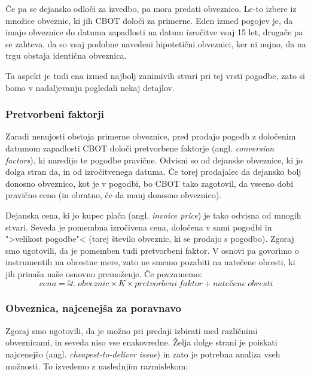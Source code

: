 \documentclass[a4paper]{article}
\begin{document}
Če pa se dejansko odloči za izvedbo, pa mora predati obveznico. Le-to izbere iz množice obveznic, ki jih
CBOT določi za primerne. Eden izmed pogojev je, da imajo obveznice do datuma zapadlosti na datum izročitve
vsaj 15 let, drugače pa se zahteva, da so vsaj podobne navedeni hipotetični obveznici, ker ni nujno, da na
trgu obstaja identična obveznica. 

Ta aspekt je tudi ena izmed najbolj zanimivih stvari pri tej vrsti pogodbe, zato si bomo v nadaljevanju 
pogledali nekaj detajlov.


\subsubsection{Pretvorbeni faktorji}
Zaradi nenujosti obstoja primerne obveznice, pred prodajo pogodb z določenim datumom zapadlosti CBOT 
določi pretvorbene faktorje (angl. \textit{conversion factors}), ki naredijo te pogodbe pravične. 
Odvisni so od dejanske obveznice, ki jo dolga stran da, in od izročitvenega datuma. Če torej prodajalec
da dejansko bolj donosno obveznico, kot je v pogodbi, bo CBOT tako zagotovil, da vseeno dobi pravično
ceno (in obratno, če da manj donosno obveznico).


Dejanska cena, ki jo kupec plača (angl. \textit{invoice price}) je tako odvisna od mnogih stvari. 
Seveda je pomembna izročivena cena, določena v sami pogodbi in ">velikost pogodbe"< (torej število
obveznic, ki se prodajo s pogodbo). Zgoraj smo ugotovili, da je pomemben tudi pretvorbeni faktor. 
V osnovi pa govorimo o instrumentih na obrestne mere, zato ne smemo pozabiti na natečene obresti, 
ki jih prinaša naše osnovno premoženje. Če povzamemo:
%
$$ cena = št.\:obveznic \times K \times pretvorbeni\:faktor + natečene\:obresti $$
%


\subsubsection{Obveznica, najcenejša za poravnavo}
Zgoraj smo ugotovili, da je možno pri predaji izbirati med različnimi obveznicami, in seveda niso
vse enakovredne. Želja dolge strani je poiskati najcenejšo (angl. \textit{cheapest-to-deliver
issue}) in zato je potrebna analiza vseh možnosti. To izvedemo z naslednjim razmislekom:
\end{document}
